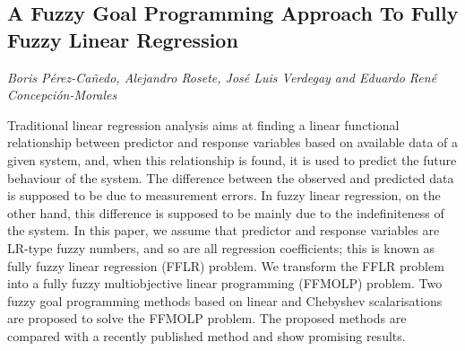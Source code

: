 \documentclass[../booklet.tex]{subfiles}
\begin{document}
\subsection[A Fuzzy Goal Programming Approach To Fully Fuzzy Linear Regression. {\it Boris Pérez-Cañedo, Alejandro Rosete, José Luis Verdegay and Eduardo René Concepción-Morales}]{A Fuzzy Goal Programming Approach To Fully Fuzzy Linear Regression}
   

\begin{center}
  {\it Boris Pérez-Cañedo, Alejandro Rosete, José Luis Verdegay and Eduardo René Concepción-Morales}
\end{center}

\vskip 0.8cm


Traditional linear regression analysis aims at finding a linear functional relationship between predictor and response variables based on available data of a given system, and, when this relationship is found, it is used to predict the future behaviour of the system. The difference between the observed and predicted data is supposed to be due to measurement errors. In fuzzy linear regression, on the other hand, this difference is supposed to be mainly due to the indefiniteness of the system. In this paper, we assume that predictor and response variables are LR-type fuzzy numbers, and so are all regression coefficients; this is known as fully fuzzy linear regression (FFLR) problem. We transform the FFLR problem into a fully fuzzy multiobjective linear programming (FFMOLP) problem. Two fuzzy goal programming methods based on linear and Chebyshev scalarisations are proposed to solve the FFMOLP problem. The proposed methods are compared with a recently published method and show promising results.

\end{document}
